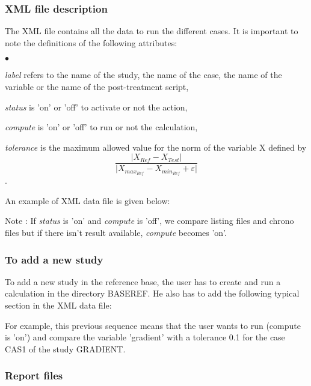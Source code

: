 \subsubsection{XML file description} 

The XML file contains all the data to run the different cases. 
It is important to note the definitions of the following attributes:
\begin{list}{$\bullet$}{}
\item {\it label} refers to the name of the study, the name of the case,
the name of the variable or the name of the post-treatment script,
\item {\it status} is 'on' or 'off' to activate or not the action, 
\item {\it compute} is 'on' or 'off' to run or not the calculation,
\item {\it tolerance} is the maximum allowed value for the norm of the
      variable X defined by
      $$\frac{\vert{X_{Ref}-X_{Test}}\vert}{\vert{X_{max_{Ref}}-X_{min_{Ref}}}+\varepsilon\vert}$$ .
\end{list} 

An example of XML data file is given below:

\begin{alltt}

\end{alltt}

Note : If {\it status} is 'on' and {\it compute} is 'off', we compare 
listing files and chrono files but if there isn't result available, 
{\it compute} becomes 'on'.


\subsubsection{To add a new study} 

To add a new study in the reference base, the user has to create and run
a calculation in the directory BASEREF. He also has to add the following
typical section in the XML data file:
\begin{alltt}

\end{alltt}
For example, this previous sequence means that the user wants to run 
(compute is 'on') and compare the variable 'gradient' with a tolerance
0.1 for the case CAS1 of the study GRADIENT.


\subsubsection{Report files} 

